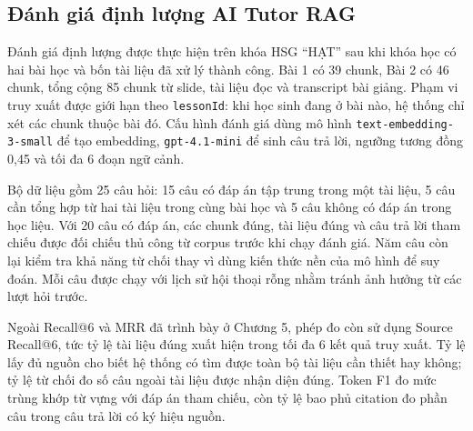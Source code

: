 \documentclass[../DoAn.tex]{subfiles}
\begin{document}
\subsection{Đánh giá định lượng AI Tutor RAG}
\label{subsection:rag_quantitative_evaluation}

Đánh giá định lượng được thực hiện trên khóa HSG ``HẠT'' sau khi khóa học có hai bài học và bốn tài liệu đã xử lý thành công. Bài 1 có 39 chunk, Bài 2 có 46 chunk, tổng cộng 85 chunk từ slide, tài liệu đọc và transcript bài giảng. Phạm vi truy xuất được giới hạn theo \texttt{lessonId}: khi học sinh đang ở bài nào, hệ thống chỉ xét các chunk thuộc bài đó. Cấu hình đánh giá dùng mô hình \texttt{text-embedding-3-small} để tạo embedding, \texttt{gpt-4.1-mini} để sinh câu trả lời, ngưỡng tương đồng 0,45 và tối đa 6 đoạn ngữ cảnh.

Bộ dữ liệu gồm 25 câu hỏi: 15 câu có đáp án tập trung trong một tài liệu, 5 câu cần tổng hợp từ hai tài liệu trong cùng bài học và 5 câu không có đáp án trong học liệu. Với 20 câu có đáp án, các chunk đúng, tài liệu đúng và câu trả lời tham chiếu được đối chiếu thủ công từ corpus trước khi chạy đánh giá. Năm câu còn lại kiểm tra khả năng từ chối thay vì dùng kiến thức nền của mô hình để suy đoán. Mỗi câu được chạy với lịch sử hội thoại rỗng nhằm tránh ảnh hưởng từ các lượt hỏi trước.

Ngoài Recall@6 và MRR đã trình bày ở Chương 5, phép đo còn sử dụng Source Recall@6, tức tỷ lệ tài liệu đúng xuất hiện trong tối đa 6 kết quả truy xuất. Tỷ lệ lấy đủ nguồn cho biết hệ thống có tìm được toàn bộ tài liệu cần thiết hay không; tỷ lệ từ chối đo số câu ngoài tài liệu được nhận diện đúng. Token F1 đo mức trùng khớp từ vựng với đáp án tham chiếu, còn tỷ lệ bao phủ citation đo phần câu trong câu trả lời có ký hiệu nguồn.
\end{document}
